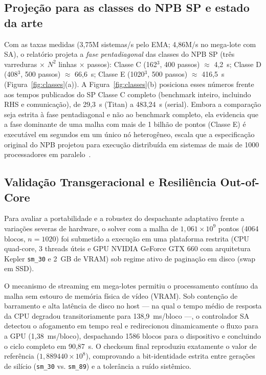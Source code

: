 \documentclass[12pt]{article}
\begin{document}
\subsection{Projeção para as classes do NPB SP e estado da arte}
\label{sec:classes}

Com as taxas medidas (3,75M sistemas/s pelo EMA; 4,86M/s no mega-lote com
SA), o relatório projeta a \emph{fase pentadiagonal} das classes do NPB SP
(três varreduras $\times$ $N^2$ linhas $\times$ passos): Classe C (162$^3$,
400 passos) $\approx$ 4,2~s; Classe D (408$^3$, 500 passos) $\approx$
66,6~s; Classe E (1020$^3$, 500 passos) $\approx$ 416,5~s
(Figura~\ref{fig:classes}(a)). A Figura~\ref{fig:classes}(b) posiciona esses números frente aos tempos publicados do SP Classe C completo (benchmark inteiro, incluindo RHS e comunicação), de 29,3~s (Titan) a 483,24~s (serial). Embora a comparação seja estrita à fase pentadiagonal e não ao benchmark completo, ela evidencia que a fase dominante de uma malha com mais de 1 bilhão de pontos (Classe E) é executável em segundos em um único nó heterogêneo, escala que a especificação original do NPB projetou para execução distribuída em sistemas de mais de 1000 processadores em paralelo~\cite{bailey1993nas}.



\subsection{Validação Transgeracional e Resiliência Out-of-Core}
Para avaliar a portabilidade e a robustez do despachante adaptativo frente a variações severas de hardware, o solver com a malha de $1{,}061 \times 10^9$ pontos (4064 blocos, $n=1020$) foi submetido a execução em uma plataforma restrita (CPU quad-core, 3 threads úteis e GPU NVIDIA GeForce GTX 660 com arquitetura Kepler \texttt{sm\_30} e 2~GB de VRAM) sob regime ativo de paginação em disco (swap em SSD).

O mecanismo de streaming em mega-lotes permitiu o processamento contínuo da malha sem estouro de memória física de vídeo (VRAM). Sob contenção de barramento e alta latência de disco no host --- na qual o tempo médio de resposta da CPU degradou transitoriamente para 138,9~ms/bloco ---, o controlador SA detectou o afogamento em tempo real e redirecionou dinamicamente o fluxo para a GPU (1,38~ms/bloco), despachando 1586 blocos para o dispositivo e concluindo o ciclo completo em 90,87~s. O checksum final reproduziu exatamente o valor de referência ($1{,}889440\times 10^8$), comprovando a bit-identidade estrita entre gerações de silício (\texttt{sm\_30} vs. \texttt{sm\_89}) e a tolerância a ruído sistêmico.
\end{document}
